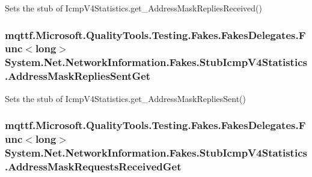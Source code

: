Sets the stub of Icmp\-V4\-Statistics.\-get\-\_\-\-Address\-Mask\-Replies\-Received()

\hypertarget{class_system_1_1_net_1_1_network_information_1_1_fakes_1_1_stub_icmp_v4_statistics_a409ab8d6180c00c20c9c9616dc556a3a}{
\subsubsection[{Address\-Mask\-Replies\-Sent\-Get}]{\setlength{\rightskip}{0pt plus 5cm}mqttf.\-Microsoft.\-Quality\-Tools.\-Testing.\-Fakes.\-Fakes\-Delegates.\-Func$<$long$>$ System.\-Net.\-Network\-Information.\-Fakes.\-Stub\-Icmp\-V4\-Statistics.\-Address\-Mask\-Replies\-Sent\-Get}}\label{class_system_1_1_net_1_1_network_information_1_1_fakes_1_1_stub_icmp_v4_statistics_a409ab8d6180c00c20c9c9616dc556a3a}


Sets the stub of Icmp\-V4\-Statistics.\-get\-\_\-\-Address\-Mask\-Replies\-Sent()

\hypertarget{class_system_1_1_net_1_1_network_information_1_1_fakes_1_1_stub_icmp_v4_statistics_a23417251b0863348e959c0495b0ba3fe}{
\subsubsection[{Address\-Mask\-Requests\-Received\-Get}]{\setlength{\rightskip}{0pt plus 5cm}mqttf.\-Microsoft.\-Quality\-Tools.\-Testing.\-Fakes.\-Fakes\-Delegates.\-Func$<$long$>$ System.\-Net.\-Network\-Information.\-Fakes.\-Stub\-Icmp\-V4\-Statistics.\-Address\-Mask\-Requests\-Received\-Get}}\label{class_system_1_1_net_1_1_network_information_1_1_fakes_1_1_stub_icmp_v4_statistics_a23417251b0863348e959c0495b0ba3fe}


